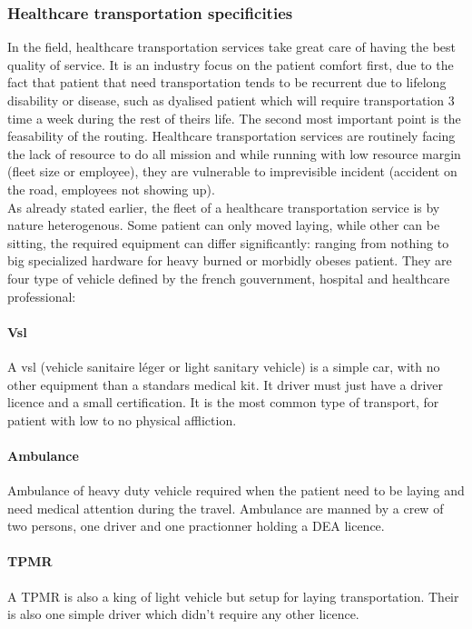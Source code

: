 \documentclass[12pt]{memoir}
\begin{document}

\subsubsection{Healthcare transportation specificities}
\label{sub:Healthcare transportation specificities}
In the field, healthcare transportation services take great care of having the best
quality of service. It is an industry focus on the patient comfort first, due to the
fact that patient that need transportation tends to be recurrent due to lifelong
disability or disease, such as dyalised patient which will require transportation 3
time a week during the rest of theirs life.
The second most important point is the feasability of the routing. Healthcare
transportation services are routinely facing the lack of resource to do all mission
and while running with low resource margin (fleet size or employee), they are
vulnerable to imprevisible incident (accident on the road, employees not showing
up).\\

As already stated earlier, the fleet of a healthcare transportation service is by
nature heterogenous. Some patient can only moved laying, while other can be sitting,
the required equipment can differ significantly: ranging from nothing to big specialized
hardware for heavy burned or morbidly obeses patient. They are four type of vehicle
defined by the french gouvernment, hospital and healthcare professional:

\paragraph{Vsl} %
\label{par:VSL}
A vsl (vehicle sanitaire léger or light sanitary vehicle) is a simple car, with no
other equipment than a standars medical kit. It driver must just have a driver
licence and a small certification. It is the most common type of transport, for
patient with low to no physical affliction.

\paragraph{Ambulance} %
\label{par:Ambulance}
Ambulance of heavy duty vehicle required when the patient need to be laying and need
medical attention during the travel. Ambulance are manned by a crew of two persons,
one driver and one practionner holding a DEA licence.

  \paragraph{TPMR} %
\label{par:TPMR}
A TPMR is also a king of light vehicle but setup for laying transportation. Their is
also one simple driver which didn't require any other licence. 
\end{document}
